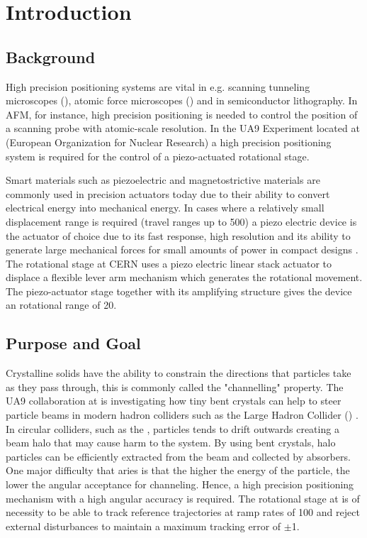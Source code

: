 \chapter{Introduction}\label{cha:intro}

\section{Background}
High precision positioning systems are vital in e.g. scanning tunneling microscopes (\abbrSTM), atomic force microscopes (\abbrAFM) and in semiconductor lithography. In AFM, for instance, high precision positioning is needed to control the position of a scanning probe with atomic-scale resolution. In the UA9 Experiment located at \abbrCERN (European Organization for Nuclear Research) a high precision positioning system is required for the control of a piezo-actuated rotational stage.

Smart materials such as piezoelectric and magnetostrictive materials are commonly used in precision actuators today due to their ability to convert electrical energy into mechanical energy. %
In cases where a relatively small displacement range is required (travel ranges up to \unit{500}{\micro\meter}) a piezo electric device is the actuator of choice due to its fast response, high resolution and its ability to generate large mechanical forces for small amounts of power in compact designs \citep{SurveyOfControlIssues:2007}. The rotational stage at CERN uses a piezo electric linear stack actuator to displace a flexible lever arm mechanism which generates the rotational movement. The piezo-actuator stage together with its amplifying structure gives the device an rotational range of \unit{20}{\milli\rad}.

\section{Purpose and Goal}
Crystalline solids have the ability to constrain the directions that particles take as they pass through, this is commonly called the "channelling" property. The UA9 collaboration at \abbrCERN is investigating how tiny bent crystals can help to steer particle beams in modern hadron colliders such as the Large Hadron Collider (\abbrLHC) \citep{WebsiteUA9:2016}. In circular colliders, such as the \abbrLHC, particles tends to drift outwards creating a beam halo that may cause harm to the system. By using bent crystals, halo particles can be efficiently extracted from the beam and collected by absorbers.
One major difficulty that aries is that the higher the energy of the particle, the lower the angular acceptance for channeling. Hence, a high precision positioning mechanism with a high angular accuracy is required. The rotational stage at \abbrCERN is of necessity to be able to track reference trajectories at ramp rates of \unit{100}{\micro\radianpersecond} and reject external disturbances to maintain a maximum tracking error of $\pm$\unit{1}{\micro\rad}.

